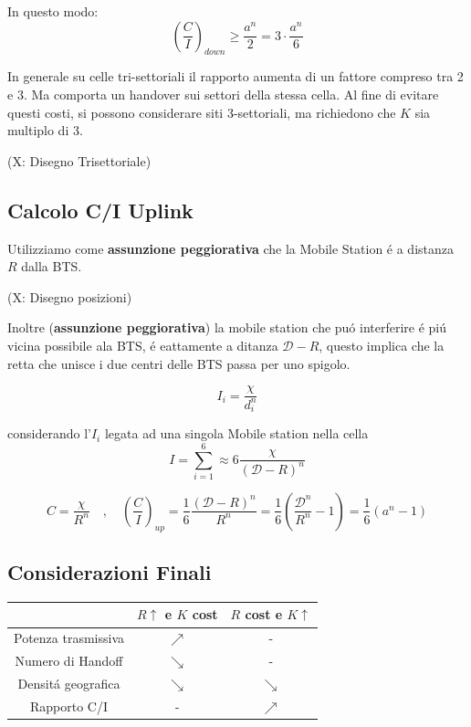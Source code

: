 \documentclass{article}
\begin{document}
In questo modo:
\[ {\left(\frac{C}{I}\right)}_{down}  \ge \frac{a^n}{2} = 3\cdot\frac{a^n}{6}\]

In generale su celle tri-settoriali il rapporto aumenta di un fattore compreso tra 2 e 3. Ma comporta un handover sui settori della stessa cella. Al fine di evitare questi costi, si possono considerare siti 3-settoriali, ma richiedono che $K$ sia multiplo di 3.

(X: Disegno Trisettoriale)

\subsection{Calcolo C/I Uplink}
Utilizziamo come \textbf{assunzione peggiorativa} che la Mobile Station \'e a distanza $R$ dalla BTS.

(X: Disegno posizioni)

Inoltre (\textbf{assunzione peggiorativa}) la mobile station che pu\'o interferire \'e pi\'u vicina possibile ala BTS, \'e eattamente a ditanza $\mathcal{D} - R$, questo implica che la retta che unisce i due centri delle BTS passa per uno spigolo.

\[I_i = \frac{\chi}{d_i^n} \]

considerando l'$I_i$ legata ad una singola Mobile station nella cella
\[ I = \sum\limits_{i=1}^6 \approx 6\frac{\chi}{{(\mathcal{D} - R)}^n} \]

\[ C = \frac{\chi}{R^n} \quad,\quad {\left(\frac{C}{I}\right)}_{up}
    = \frac{1}{6}\frac{{(\mathcal{D} - R)}^n}{R^n}
    = \frac{1}{6}\left(\frac{\mathcal{D}^n}{R^n} -1 \right) = \frac{1}{6}(a^n - 1)
\]

\subsection{Considerazioni Finali}
\begin{center}
\begin{tabular}{c|c|c}
    & $R\uparrow$ e $K$ cost & $R$ cost e $K\uparrow$\\
    \hline
    Potenza trasmissiva  & {\color{red}$\nearrow$}  & -\\
    Numero di Handoff    & {\color{green}$\searrow$}& -\\
    Densit\'a geografica & {\color{red}$\searrow$}  & {\color{red}$\searrow$}\\
    Rapporto C/I         &                         -& {\color{green}$\nearrow$}
\end{tabular}
\end{center}
\end{document}

